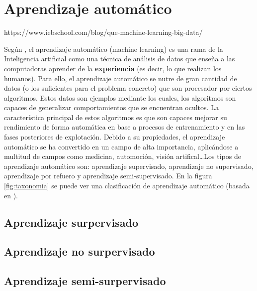 

\section{Aprendizaje automático}

https://www.iebschool.com/blog/que-machine-learning-big-data/

Según \cite{intelligent:ml}, el aprendizaje automático (machine learning) es una
rama de la Inteligencia artificial como una técnica de análisis de datos que
enseña a las computadoras aprender de la \textbf{experiencia} (es decir, lo que
realizan los humanos). Para ello, el aprendizaje automático se nutre de gran
cantidad de datos (o los suficientes para el problema concreto) que son
procesador por ciertos algoritmos. Estos datos son ejemplos \cite{pascual:ml}
mediante los cuales, los algoritmos son capaces de generalizar comportamientos
que se encuentran ocultos. La característica principal de estos algoritmos es
que son capaces mejorar su rendimiento de forma automática en base a procesos de
entrenamiento y en las fases posteriores de explotación. Debido a su
propiedades, el aprendizaje automático se ha convertido en un campo de alta
importancia, aplicándose a multitud de campos como medicina, automoción, visión
artifical\ldots Los tipos de aprendizaje automático son: aprendizaje
supervisado, aprendizaje no supervisado, aprendizaje por refuero y aprendizaje
semi-supervisado. En la figura \ref{fig:taxonomia} se puede ver una
clasificación de aprendizaje automático (basada en \cite{neova:taxonomy}).

\subsection{Aprendizaje surpervisado}





\subsection{Aprendizaje no surpervisado}

\subsection{Aprendizaje semi-surpervisado}

